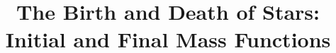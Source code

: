\documentclass[11pt]{article}
\begin{document}



%



%
%

\title{The Birth and Death of Stars: Initial and Final Mass Functions}


%


\begin{abstract}

\end{abstract}


%
\end{document}
